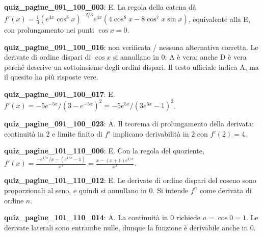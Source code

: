 \documentclass[11pt,a4paper]{article}
\newcounter{quiz}
\begin{document}
\noindent\textbf{quiz\_pagine\_091\_100\_003}: E. La regola della catena dà $f\prime(x)=\frac13(e^{4x}\cos^8x)^{-2/3}e^{4x}(4\cos^8x-8\cos^7x\sin x)$, equivalente alla E, con prolungamento nei punti $\cos x=0$.\par\medskip
\noindent\textbf{quiz\_pagine\_091\_100\_016}: non verificata / nessuna alternativa corretta. Le derivate di ordine dispari di $\cos x$ si annullano in $0$: A è vera; anche D è vera perché descrive un sottoinsieme degli ordini dispari. Il testo ufficiale indica A, ma il quesito ha più risposte vere.\par\medskip
\noindent\textbf{quiz\_pagine\_091\_100\_017}: E. $f\prime(x)=-5e^{-5x}/(3-e^{-5x})^2=-5e^{5x}/(3e^{5x}-1)^2$.\par\medskip
\noindent\textbf{quiz\_pagine\_091\_100\_023}: A. Il teorema di prolungamento della derivata: continuità in $2$ e limite finito di $f\prime$ implicano derivabilità in $2$ con $f\prime(2)=4$.\par\medskip
\noindent\textbf{quiz\_pagine\_101\_110\_006}: E. Con la regola del quoziente, $f\prime(x)=\frac{-e^{1/x}/x- (e^{1/x}-1)}{x^2}=\frac{x-(x+1)e^{1/x}}{x^3}$.\par\medskip
\noindent\textbf{quiz\_pagine\_101\_110\_012}: E. Le derivate di ordine dispari del coseno sono proporzionali al seno, e quindi si annullano in $0$. Si intende $f^n$ come derivata di ordine $n$.\par\medskip
\noindent\textbf{quiz\_pagine\_101\_110\_014}: A. La continuità in $0$ richiede $a=\cos0=1$. Le derivate laterali sono entrambe nulle, dunque la funzione è derivabile anche in $0$.\par\medskip
\end{document}
